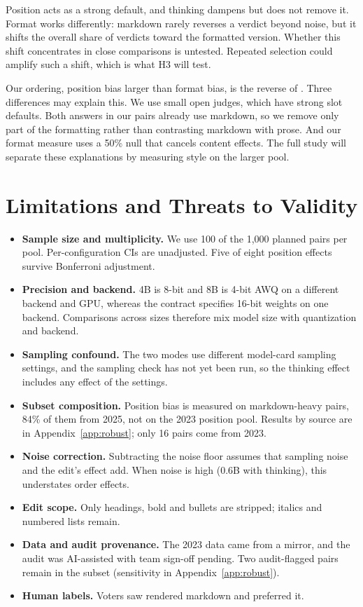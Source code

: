 \documentclass[10pt]{article}
\begin{document}
Position acts as a strong default, and thinking dampens but does not remove it. Format works differently:
markdown rarely reverses a verdict beyond noise, but it shifts the overall share of verdicts toward the formatted
version. Whether this shift concentrates in close comparisons is untested. Repeated selection could amplify such
a shift, which is what H3 will test.

Our ordering, position bias larger than format bias, is the reverse of \citet{soumik2026judging}. Three
differences may explain this. We use small open judges, which have strong slot defaults. Both answers in our pairs
already use markdown, so we remove only part of the formatting rather than contrasting markdown with prose. And
our format measure uses a 50\% null that cancels content effects. The full study will separate these
explanations by measuring style on the larger pool.

\section{Limitations and Threats to Validity}
\begin{itemize}
\item \textbf{Sample size and multiplicity.} We use 100 of the 1{,}000 planned pairs per pool. Per-configuration
CIs are unadjusted. Five of eight position effects survive Bonferroni adjustment.
\item \textbf{Precision and backend.} 4B is 8-bit and 8B is 4-bit AWQ on a different backend and GPU, whereas the
contract specifies 16-bit weights on one backend. Comparisons across sizes therefore mix model size with
quantization and backend.
\item \textbf{Sampling confound.} The two modes use different model-card sampling settings, and the
sampling check has not yet been run, so the thinking effect includes any effect of the settings.
\item \textbf{Subset composition.} Position bias is measured on markdown-heavy pairs, 84\% of them from 2025, not
on the 2023 position pool. Results by source are in Appendix~\ref{app:robust}; only 16 pairs come from 2023.
\item \textbf{Noise correction.} Subtracting the noise floor assumes that sampling noise and the edit's effect
add. When noise is high (0.6B with thinking), this understates order effects.
\item \textbf{Edit scope.} Only headings, bold and bullets are stripped; italics and numbered lists remain.
\item \textbf{Data and audit provenance.} The 2023 data came from a mirror, and the audit was AI-assisted with
team sign-off pending. Two audit-flagged pairs remain in the subset (sensitivity in Appendix~\ref{app:robust}).
\item \textbf{Human labels.} Voters saw rendered markdown and preferred it.
\end{itemize}
\end{document}
